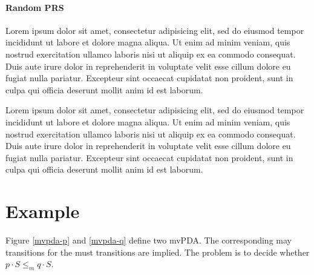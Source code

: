 \paragraph{Random PRS}

Lorem ipsum dolor sit amet, consectetur adipisicing elit, sed do eiusmod tempor incididunt ut labore et dolore magna aliqua. Ut enim ad minim veniam, quis nostrud exercitation ullamco laboris nisi ut aliquip ex ea commodo consequat. Duis aute irure dolor in reprehenderit in voluptate velit esse cillum dolore eu fugiat nulla pariatur. Excepteur sint occaecat cupidatat non proident, sunt in culpa qui officia deserunt mollit anim id est laborum.

Lorem ipsum dolor sit amet, consectetur adipisicing elit, sed do eiusmod tempor incididunt ut labore et dolore magna aliqua. Ut enim ad minim veniam, quis nostrud exercitation ullamco laboris nisi ut aliquip ex ea commodo consequat. Duis aute irure dolor in reprehenderit in voluptate velit esse cillum dolore eu fugiat nulla pariatur. Excepteur sint occaecat cupidatat non proident, sunt in culpa qui officia deserunt mollit anim id est laborum.

\section{Example}

Figure \ref{mvpda-p} and \ref{mvpda-q} define two mvPDA. The corresponding may transitions for the must transitions are implied.
The problem is to decide whether $p⋅S ≤_m q⋅S$.


